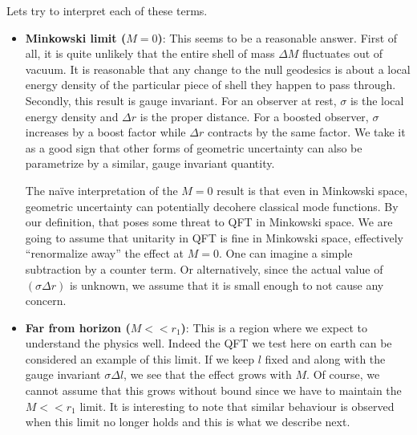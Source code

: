 \documentclass[aps,showpacs,onecolumn,floats,prd,superscriptaddress,nofootinbib]{revtex4-1}
\begin{document}
Lets try to interpret each of these terms.

\begin{itemize}

\item \textbf{Minkowski limit ($M=0$)}: This seems to be a reasonable answer. 
First of all, it is quite unlikely that the entire shell of mass $\Delta M$ fluctuates out of vacuum.
It is reasonable that any change to the null geodesics is about a local energy density of the particular piece of shell they happen to pass through.
Secondly, this result is gauge invariant. For an observer at rest, $\sigma$ is the local energy density and $\Delta r$ is the proper distance. 
For a boosted observer, $\sigma$ increases by a boost factor while $\Delta r$ contracts by the same factor.
We take it as a good sign that other forms of geometric uncertainty can also be parametrize by a similar, gauge invariant quantity.

The na\"ive interpretation of the $M=0$ result is that even in Minkowski space, geometric uncertainty can potentially decohere classical mode functions.
By our definition, that poses some threat to QFT in Minkowski space.
We are going to assume that unitarity in QFT is fine in Minkowski space, effectively ``renormalize away'' the effect at $M=0$.
One can imagine a simple subtraction by a counter term.
Or alternatively, since the actual value of $(\sigma\Delta r)$ is unknown, we assume that it is small enough to not cause any concern.

\item \textbf{Far from horizon ($M<<r_1$)}: This is a region where we expect to understand the physics well. Indeed the QFT we test here on earth can be considered an example of this limit. If we keep $l$ fixed and along with the gauge invariant $\sigma \Delta l$, we see that the effect grows with $M$. Of course, we cannot assume that this grows without bound since we have to maintain the $M<<r_1$ limit. It is interesting to note that similar behaviour is observed when this limit no longer holds and this is what we describe next. 


\end{itemize}
\end{document}

